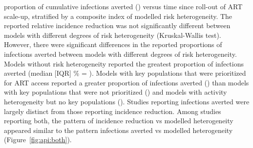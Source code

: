 proportion of cumulative infections averted ()
versus time since roll-out of ART scale-up,
stratified by a composite index of modelled risk heterogeneity.
The reported relative incidence reduction was not significantly different
between models with different degrees of risk heterogeneity (Kruskal-Wallis test).
However, there were significant differences in
the reported proportions of infections averted
between models with different degrees of risk heterogeneity.
Models without risk heterogeneity reported the greatest proportion of infections averted
(median [IQR] \% = ).
Models with key populations that were prioritized for ART access reported
a greater proportion of infections averted () than
models with key populations that were not prioritized ()
and models with activity heterogeneity but no key populations
().
Studies reporting infections averted were
largely distinct from those reporting incidence reduction.
Among  studies reporting both,
the pattern of incidence reduction vs modelled heterogeneity
appeared similar to the pattern infections averted vs modelled heterogeneity
(Figure~\ref{fig:api:both}).

